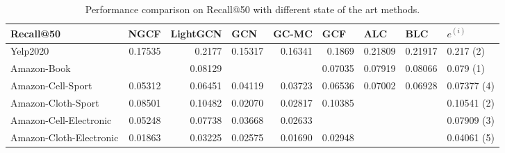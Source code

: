 \begin{table*}[]
    \centering
    \begin{tabular}{|l|r|r|r|r|r||r|r|l|}
        \hline
        Recall@50               & \multicolumn{1}{l|}{NGCF} & \multicolumn{1}{l|}{LightGCN} & \multicolumn{1}{l|}{GCN} & \multicolumn{1}{l|}{GC-MC} & \multicolumn{1}{l||}{GCF} & \multicolumn{1}{l|}{ALC} & \multicolumn{1}{l|}{BLC} & $e^{(i)}$   \\ \hline
        Yelp2020                & 0.17535                   & 0.2177                        & 0.15317                  & 0.16341                    & 0.1869                    & 0.21809                  & 0.21917                  & 0.217 (2)  \\ \hline
        Amazon-Book             &                           & 0.08129                       &                          &                            & 0.07035                   & 0.07919                  & 0.08066                  & 0.079 (1)   \\ \hline
        Amazon-Cell-Sport       & 0.05312                   & 0.06451                       & 0.04119                  & 0.03723                    & 0.06536                   & 0.07002                  & 0.06928                  & 0.07377 (4) \\ \hline
        Amazon-Cloth-Sport      & 0.08501                   & 0.10482                       & 0.02070                  & 0.02817                    & 0.10385                   &                          &                          & 0.10541 (2) \\ \hline
        Amazon-Cell-Electronic  & 0.05248                   & 0.07738                       & 0.03668                  & 0.02633                    &                           &                          &                          & 0.07909 (3) \\ \hline
        Amazon-Cloth-Electronic & 0.01863                   & 0.03225                       & 0.02575                  & 0.01690                    & 0.02948                   &                          &                          & 0.04061 (5) \\ \hline
    \end{tabular}
    \caption{Performance comparison on Recall@50 with different state of the art methods.}
    \label{tab:recallbaselines}
\end{table*}